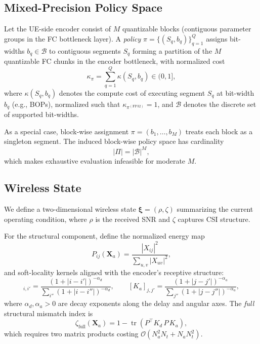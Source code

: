 \documentclass[conference]{IEEEtran}
\begin{document}
\subsection{Mixed-Precision Policy Space}
\label{subsec:policy_space}

Let the UE-side encoder consist of $M$ quantizable blocks (contiguous parameter groups in the FC bottleneck layer). A \emph{policy} $\pi=\{(S_q,b_q)\}_{q=1}^{Q}$ assigns bit-widths $b_q\in\mathcal{B}$ to contiguous segments $S_q$ forming a partition of the $M$ quantizable FC chunks in the encoder bottleneck, with normalized cost
\begin{equation}
\kappa_\pi = \sum_{q=1}^{Q} \kappa(S_q, b_q) \in (0,1],
\label{eq:kappa_policy_sum}
\end{equation}
where $\kappa(S_q, b_q)$ denotes the compute cost of executing segment $S_q$ at bit-width $b_q$ (e.g., BOPs), normalized such that $\kappa_{\pi^{(\mathrm{FP32})}}=1$, and $\mathcal{B}$ denotes the discrete set of supported bit-widths.

As a special case, block-wise assignment $\pi=(b_1,\ldots,b_M)$ treats each block as a singleton segment.
The induced block-wise policy space has cardinality
\begin{equation}
|\Pi| = |\mathcal{B}|^M,
\label{eq:policy_cardinality}
\end{equation}
which makes exhaustive evaluation infeasible for moderate $M$.

\subsection{Wireless State}
\label{subsec:wireless_state}

We define a two-dimensional wireless state $\boldsymbol{\xi}=(\rho,\zeta)$ summarizing the current operating condition, where $\rho$ is the received SNR and $\zeta$ captures CSI structure.

For the structural component, define the normalized energy map
\begin{equation}
P_{ij}(\mathbf{X}_a) = \frac{|X_{ij}|^2}{\sum_{u,v}|X_{uv}|^2},
\label{eq:energy_map}
\end{equation}
and soft-locality kernels aligned with the encoder's receptive structure:
\begin{equation}
[K_d]_{i,i'} = \frac{(1+|i-i'|)^{-\alpha_d}}{\sum_{i''}(1+|i-i''|)^{-\alpha_d}}, \qquad
[K_a]_{j,j'} = \frac{(1+|j-j'|)^{-\alpha_a}}{\sum_{j''}(1+|j-j''|)^{-\alpha_a}},
\label{eq:kernels}
\end{equation}
where $\alpha_d,\alpha_a>0$ are decay exponents along the delay and angular axes.
The \emph{full} structural mismatch index is
\begin{equation}
\zeta_{\mathrm{full}}(\mathbf{X}_a) = 1 - \operatorname{tr}\!\left(P^\top K_d\, P\, K_a\right),
\label{eq:zeta_full}
\end{equation}
which requires two matrix products costing $\mathcal{O}(N_a^2 N_t + N_a N_t^2)$.
\end{document}
